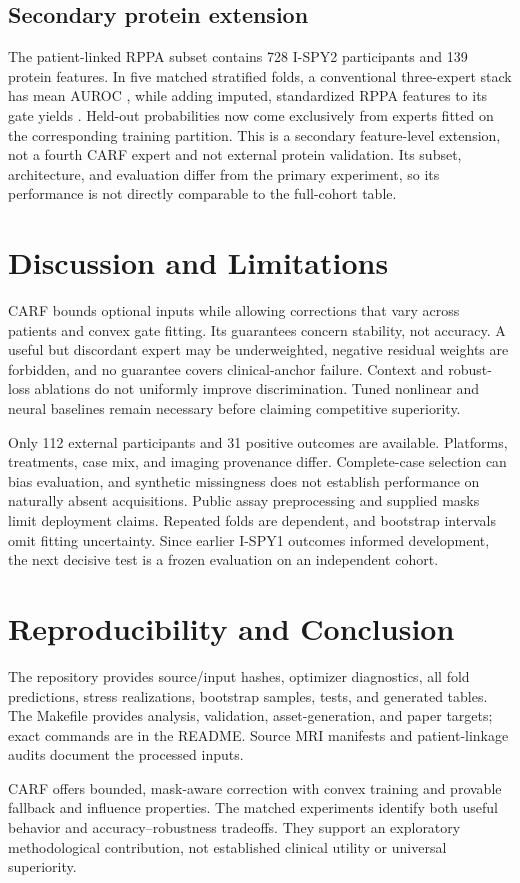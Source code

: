 \documentclass[runningheads]{llncs}
\begin{document}
\subsection{Secondary protein extension}
The patient-linked RPPA subset contains 728 I-SPY2 participants and 139 protein features. In five matched stratified folds, a conventional three-expert stack has mean AUROC \RppaThreeAuc{}, while adding imputed, standardized RPPA features to its gate yields \RppaFourAuc{}. Held-out probabilities now come exclusively from experts fitted on the corresponding training partition. This is a secondary feature-level extension, not a fourth CARF expert and not external protein validation. Its subset, architecture, and evaluation differ from the primary experiment, so its performance is not directly comparable to the full-cohort table.

\section{Discussion and Limitations}
CARF bounds optional inputs while allowing corrections that vary across patients and convex gate fitting. Its guarantees concern stability, not accuracy. A useful but discordant expert may be underweighted, negative residual weights are forbidden, and no guarantee covers clinical-anchor failure. Context and robust-loss ablations do not uniformly improve discrimination. Tuned nonlinear and neural baselines remain necessary before claiming competitive superiority.

Only 112 external participants and 31 positive outcomes are available. Platforms, treatments, case mix, and imaging provenance differ. Complete-case selection can bias evaluation, and synthetic missingness does not establish performance on naturally absent acquisitions. Public assay preprocessing and supplied masks limit deployment claims. Repeated folds are dependent, and bootstrap intervals omit fitting uncertainty. Since earlier I-SPY1 outcomes informed development, the next decisive test is a frozen evaluation on an independent cohort.

\section{Reproducibility and Conclusion}
The repository provides source/input hashes, optimizer diagnostics, all fold predictions, stress realizations, bootstrap samples, tests, and generated tables. The Makefile provides analysis, validation, asset-generation, and paper targets; exact commands are in the README. Source MRI manifests and patient-linkage audits document the processed inputs.

CARF offers bounded, mask-aware correction with convex training and provable fallback and influence properties. The matched experiments identify both useful behavior and accuracy--robustness tradeoffs. They support an exploratory methodological contribution, not established clinical utility or universal superiority.



\end{document}
